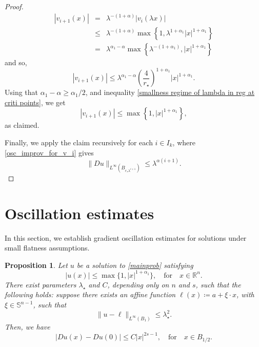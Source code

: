 \documentclass[reqno,11pt]{amsart}
\newtheorem{proposition}{Proposition}[section]
\numberwithin{equation}{section}
\numberwithin{equation}{section}
\begin{document}
\begin{proof}
\begin{eqnarray*}
|v_{i+1}(x)| & = & \lambda^{-(1+\alpha)}|v_i(\lambda x)|\\
& \leq & \lambda^{-(1+\alpha)}\max\left\{1, \lambda^{1+\alpha_1}|x|^{1+\alpha_1} \right\}\\
& = & \lambda^{\alpha_1 - \alpha}\max\left\{\lambda^{-(1+\alpha_1)} ,|x|^{1+\alpha_1} \right\}
\end{eqnarray*}
and so,
\begin{equation}\nonumber
|v_{i+1}(x)| \leq \lambda^{\alpha_1 - \alpha}\left(\frac{4}{r_\star}\right)^{1+\alpha_1} |x|^{1+\alpha_1}.
\end{equation}
Using that $\alpha_1 - \alpha \geq \alpha_1/2$, and inequality \eqref{smallness regime of lambda in reg at criti points}, we get 
$$
|v_{i+1}(x)| \leq \max\left\{1,|x|^{1+\alpha_1} \right\},
$$
as claimed.

Finally, we apply the claim recursively for each $i \in I_k$, where \eqref{osc_improv_for_v_i} gives
$$
    \|Du\|_{L^\infty\left(B_{r_\star \lambda^{i+1}}\right)} \leq \lambda^{\alpha(i+1)}.
$$
\end{proof}

\section{Oscillation estimates}\label{smallperturb-section}

In this section, we establish gradient oscillation estimates for solutions under small flatness assumptions. 

\begin{proposition}\label{small pert argument}
Let $u$ be a solution to \eqref{mainprob} satisfying
$$
    |u(x)| \leq \max\{1, |x|^{1+\alpha_1}\}, \quad \text{for} \quad x \in \mathbb{R}^n.
$$
There exist parameters $\lambda_\star$ and $C$, depending only on $n$ and $s$, such that the following holds: suppose there exists an affine function 
$\ell(x) \coloneqq a + \xi \cdot x$, with $\xi \in \mathbb{S}^{n-1}$, such that
\begin{equation}\label{proximity}
    \|u - \ell\|_{L^\infty(B_1)} \leq \lambda_\star^2.
\end{equation}
Then, we have
$$
    |Du(x) - Du(0)| \leq C |x|^{2s-1}, \quad \mbox{for} \quad x \in B_{1/2}.
$$
\end{proposition}
\end{document}
